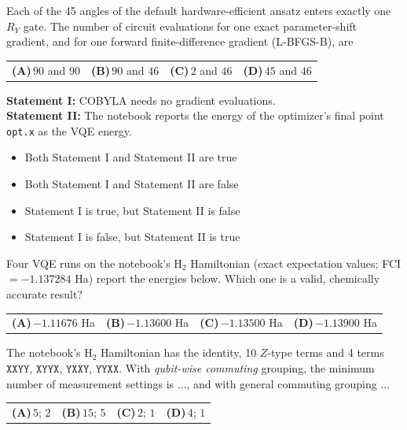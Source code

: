 \documentclass[11pt,a4paper]{article}
\newcommand{\optlabel}[1]{\textbf{(#1)}}
\newenvironment{qitem}[1]{\begin{list}{}{\setlength{\leftmargin}{3.3em}\setlength{\labelwidth}{3.1em}%
  \setlength{\labelsep}{0.2em}\setlength{\topsep}{3pt}\setlength{\parsep}{3pt}}\item[\textbf{Q.#1}\hfill]}{\end{list}}
\newcommand{\qsep}{\par\vspace{2pt}{\color{black!15}\hrule}\vspace{4pt}}
\begin{document}
\begin{qitem}{51}
Each of the 45 angles of the default hardware-efficient ansatz enters exactly one $R_Y$ gate. The number of circuit evaluations for one exact
parameter-shift gradient, and for one forward finite-difference gradient (L-BFGS-B), are
\par\smallskip\noindent\begin{tabularx}{\linewidth}{@{}*{4}{L}@{}}
\optlabel{A}\,$90$ and $90$ & \optlabel{B}\,$90$ and $46$ & \optlabel{C}\,$2$ and $46$ & \optlabel{D}\,$45$ and $46$
\end{tabularx}
\end{qitem}
\qsep

\begin{qitem}{52}
\textbf{Statement I:} COBYLA needs no gradient evaluations.\\[1mm]
\textbf{Statement II:} The notebook reports the energy of the optimizer's final point \texttt{opt.x} as the VQE energy.
\begin{itemize}[leftmargin=2.6em, labelsep=0.4em, itemsep=2pt, topsep=3pt]
\item[\optlabel{A}] Both Statement I and Statement II are true
\item[\optlabel{B}] Both Statement I and Statement II are false
\item[\optlabel{C}] Statement I is true, but Statement II is false
\item[\optlabel{D}] Statement I is false, but Statement II is true
\end{itemize}
\end{qitem}
\qsep

\begin{qitem}{53}
Four VQE runs on the notebook's H$_2$ Hamiltonian (exact expectation values; FCI $= -1.137284$ Ha) report the energies below. Which one is a valid,
chemically accurate result?
\par\smallskip\noindent\begin{tabularx}{\linewidth}{@{}*{4}{L}@{}}
\optlabel{A}\,$-1.11676$ Ha & \optlabel{B}\,$-1.13600$ Ha & \optlabel{C}\,$-1.13500$ Ha & \optlabel{D}\,$-1.13900$ Ha
\end{tabularx}
\end{qitem}
\qsep

\begin{qitem}{54}
The notebook's H$_2$ Hamiltonian has the identity, 10 $Z$-type terms and 4 terms $\texttt{XXYY}$, $\texttt{XYYX}$, $\texttt{YXXY}$, $\texttt{YYXX}$. With
\emph{qubit-wise commuting} grouping, the minimum number of measurement settings is ..., and with general commuting grouping ...
\par\smallskip\noindent\begin{tabularx}{\linewidth}{@{}*{4}{L}@{}}
\optlabel{A}\,$5$; $2$ & \optlabel{B}\,$15$; $5$ & \optlabel{C}\,$2$; $1$ & \optlabel{D}\,$4$; $1$
\end{tabularx}
\end{qitem}
\qsep
\end{document}
